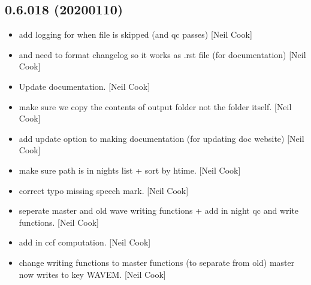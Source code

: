\documentclass[a4paper,10pt,english]{report}
\begin{document}
\subsection{0.6.018 (2020\sphinxhyphen{}01\sphinxhyphen{}10)}
\label{\detokenize{misc/changelog:id20}}\begin{itemize}
\item {} 
 \sphinxhyphen{} add logging for when file
is skipped (and qc passes) {[}Neil Cook{]}

\item {} 
 and
 \sphinxhyphen{} need to format changelog so it
works as .rst file (for documentation) {[}Neil Cook{]}

\item {} 
Update documentation. {[}Neil Cook{]}

\item {} 
 \sphinxhyphen{} make sure we copy
the contents of output folder not the folder itself. {[}Neil Cook{]}

\item {} 
 \sphinxhyphen{} add update option to making
documentation (for updating doc website) {[}Neil Cook{]}

\item {} 
 \sphinxhyphen{} make sure path is in nights
list + sort by htime. {[}Neil Cook{]}

\item {} 
 \sphinxhyphen{} correct typo \textendash{} missing
speech mark. {[}Neil Cook{]}

\item {} 
 \sphinxhyphen{} seperate master and old wave writing functions
+ add in night qc and write functions. {[}Neil Cook{]}

\item {} 
 \sphinxhyphen{} add in ccf computation. {[}Neil Cook{]}

\item {} 
 \sphinxhyphen{} change writing functions to master
functions (to separate from  \textendash{} old) \sphinxhyphen{} master now writes to
key WAVEM. {[}Neil Cook{]}


\end{itemize}
\end{document}

